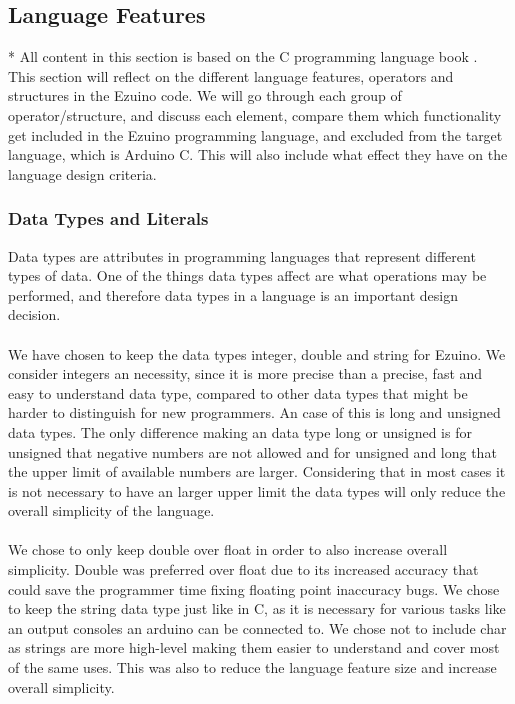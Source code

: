 \subsection{Language Features}
\label{language-features}
* All content in this section is based on the C programming language book \cite{kernighan1988c}.\\
This section will reflect on the different language features, operators and structures in the Ezuino code. We will go through each group of operator/structure, and discuss each element, compare them which functionality get included in the Ezuino programming language, and excluded from the target language, which is Arduino C. This will also include what effect they have on the language design criteria.\\
\subsubsection*{Data Types and Literals}
Data types are attributes in programming languages that represent different types of data. One of the things data types affect are what operations may be performed, and therefore data types in a language is an important design decision. 
\\ \\
We have chosen to keep the data types integer, double and string for Ezuino. We consider integers an necessity, since it is more precise than a precise, fast and easy to understand data type, compared to other data types that might be harder to distinguish for new programmers. An case of this is long and unsigned data types. The only difference making an data type long or unsigned is for unsigned that negative numbers are not allowed and for unsigned and long that the upper limit of available numbers are larger. Considering that in most cases it is not necessary to have an larger upper limit the data types will only reduce the overall simplicity of the language. 
\\  \\
We chose to only keep double over float in order to also increase overall simplicity. Double was preferred over float due to its increased accuracy that could save the programmer time fixing floating point inaccuracy bugs.  We chose to keep the string data type just like in C, as it is necessary for various tasks like an output consoles an arduino can be connected to. We chose not to include char as strings are more high-level making them easier to understand and cover most of the same uses. This was also to reduce the language feature size and increase overall simplicity. 

